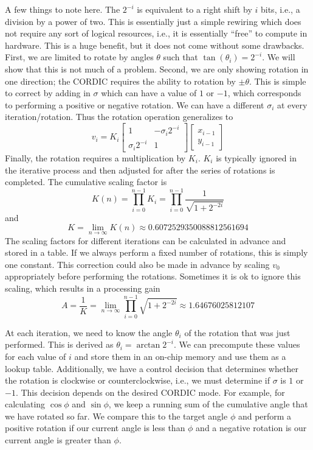 A few things to note here. The $2^{-i}$ is equivalent to a right shift by $i$ bits, i.e., a division by a power of two. This is essentially just a simple rewiring which does not require any sort of logical resources, i.e., it is essentially ``free'' to compute in hardware. This is a huge benefit, but it does not come without some drawbacks. First, we are limited to rotate by angles $\theta$ such that $\tan(\theta_i) = 2^{-i}$. We will show that this is not much of a problem. Second, we are only showing rotation in one direction; the CORDIC requires the ability to rotation by $\pm \theta$. This is simple to correct by adding in $\sigma$ which can have a value of $1$ or $-1$, which corresponds to performing a positive or negative rotation. We can have a different $\sigma_i$ at every iteration/rotation. Thus the rotation operation generalizes to
\begin{equation}
v_i = K_i \begin{bmatrix} 1 & -\sigma_i 2^{-i} \\ \sigma_i 2^{-i} & 1 \end{bmatrix} \begin{bmatrix} x_{i-1} \\ y_{i-1} \end{bmatrix}
\end{equation}
Finally, the rotation requires a multiplication by $K_i$.  $K_i$ is typically ignored in the iterative process and then adjusted for after the series of rotations is completed. The cumulative scaling factor is
\begin{equation}
K(n) = \prod_{i=0}^{n-1} K_i  = \prod_{i=0}^{n-1}\frac {1}{\sqrt{1 + 2^{-2i}}}
\end{equation} and  
\begin{equation}
K = \lim_{n \to \infty}K(n) \approx 0.6072529350088812561694
\end{equation}
The scaling factors for different iterations can be calculated in advance and stored in a table. If we always perform a fixed number of rotations, this is simply one constant. This correction could also be made in advance by scaling $v_0$ appropriately before performing the rotations. Sometimes it is ok to ignore this scaling, which results in a processing gain
\begin{equation}
A = \frac{1}{K} = \lim_{n \to \infty} \prod_{i=0}^{n-1} {\sqrt{1 + 2^{-2i}}}\approx 1.64676025812107
\label{eq:cordicgain}
\end{equation}

At each iteration, we need to know the angle $\theta_i$ of the rotation that was just performed. This is derived as $\theta_i = \arctan 2^{-i}$. We can precompute these values for each value of $i$ and store them in an on-chip memory and use them as a lookup table. Additionally, we have a control decision that determines whether the rotation is clockwise or counterclockwise, i.e., we must determine if $\sigma$ is $1$ or $-1$. This decision depends on the desired CORDIC mode. For example, for calculating $\cos \phi$ and $\sin \phi$, we keep a running sum of the cumulative angle that we have rotated so far. We compare this to the target angle $\phi$ and perform a positive rotation if our current angle is less than $\phi$ and a negative rotation is our current angle is greater than $\phi$. 


